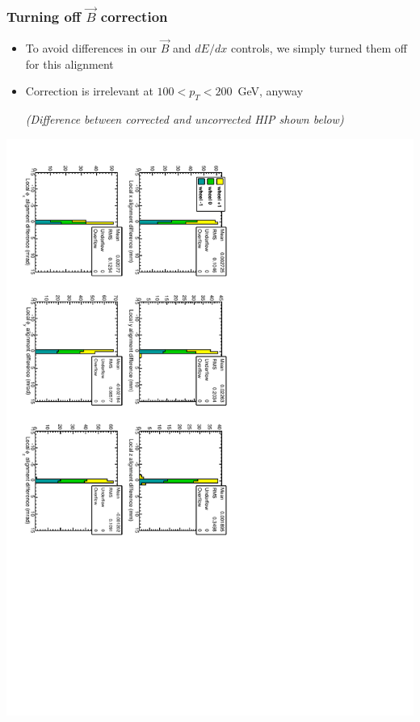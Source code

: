 \documentclass[compress]{beamer}
\begin{document}
\begin{frame}
\frametitle{Turning off $\vec{B}$ correction}
\begin{itemize}
\item To avoid differences in our $\vec{B}$ and $dE/dx$ controls, we simply turned them off for this alignment
\item Correction is irrelevant at $100 < p_T < 200$~GeV, anyway

{\scriptsize \it (Difference between corrected and uncorrected HIP shown below)}
\end{itemize}

\includegraphics[height=\linewidth, angle=90]{hip_2bin_difference.pdf}
\end{frame}
\end{document}
